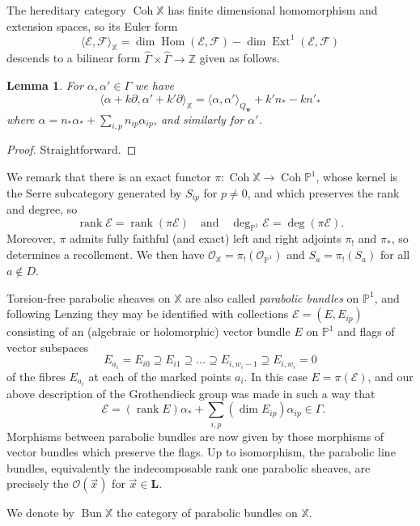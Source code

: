 \documentclass[12pt,a4paper]{amsart}
\theoremstyle{plain}
\newtheorem{lem}[thm]{Lemma}
\newcommand{\Z}{\mathbb Z}
\newcommand{\PP}{\mathbb P}
\DeclareMathOperator{\Coh}{Coh}
\DeclareMathOperator{\Hom}{Hom}
\DeclareMathOperator{\Ext}{Ext}
\DeclareMathOperator{\rank}{rank}
\DeclareMathOperator{\Bun}{Bun}
\DeclareMathOperator{\dimv}{\underline\dim}
\newcommand{\OO}{\mathcal O}
\newcommand{\F}{\mathcal F}
\newcommand{\E}{\mathcal E}
\newcommand{\XX}{\mathbb X}
\newcommand{\bw}{\mathbf w}
\begin{document}
The hereditary category $\Coh\XX$ has finite dimensional homomorphism and extension spaces, so its Euler form
\[ \langle \E,\F \rangle_\XX = \dim\Hom(\E,\F) - \dim\Ext^1(\E,\F) \]
descends to a bilinear form $\hat\Gamma\times\hat\Gamma\to\Z$ given as follows.

\begin{lem}
For $\alpha,\alpha'\in\Gamma$ we have
\[ \langle \alpha + k\partial, \alpha' + k'\partial \rangle_\XX =
\langle \alpha,\alpha'\rangle_{Q_\bw} + k' n_* - k n'_* \]
where $\alpha=n_\ast\alpha_\ast+\sum_{i,p}n_{ip}\alpha_{ip}$, and similarly for $\alpha'$.
\end{lem}

\begin{proof}
Straightforward.
\end{proof}

We remark that there is an exact functor $\pi\colon\Coh\XX\to\Coh\PP^1$, whose kernel is the Serre subcategory generated by $S_{ip}$ for $p\neq0$, and which preserves the rank and degree, so
\[ \rank\E = \rank(\pi\E) \quad\textrm{and}\quad \deg_{\PP^1}\E = \deg(\pi\E). \]
Moreover, $\pi$ admits fully faithful (and exact) left and right adjoints $\pi_!$ and $\pi_\ast$, so determines a recollement. We then have $\OO_\XX=\pi_!(\OO_{\PP^1})$ and $S_a=\pi_!(S_a)$ for all $a\notin D$.

Torsion-free parabolic sheaves on $\XX$ are also called \emph{parabolic bundles} on $\PP^1$, and following Lenzing \cite{L} they may be identified with collections $\E = (E,E_{ip})$ consisting of an (algebraic or holomorphic) vector bundle $E$ on $\PP^1$ and flags of vector subspaces
\[
E_{a_i} = E_{i0} \supseteq E_{i1} \supseteq \dots \supseteq E_{i,w_i-1} \supseteq E_{i,w_i} = 0
\]
of the fibres $E_{a_i}$ at each of the marked points $a_i$. In this case $E=\pi(\E)$, and our above description of the Grothendieck group was made in such a way that
\[
\dimv \E = (\rank E)\alpha_\ast + \sum_{i,p} (\dim E_{ip})\alpha_{ip} \in \Gamma.
\]
Morphisms between parabolic bundles are now given by those morphisms of vector bundles which preserve the flags. Up to isomorphism, the parabolic line bundles, equivalently the indecomposable rank one parabolic sheaves, are precisely the $\OO(\vec x)$ for $\vec x\in\mathbf L$.

We denote by $\Bun\XX$ the category of parabolic bundles on $\XX$.
\end{document}
